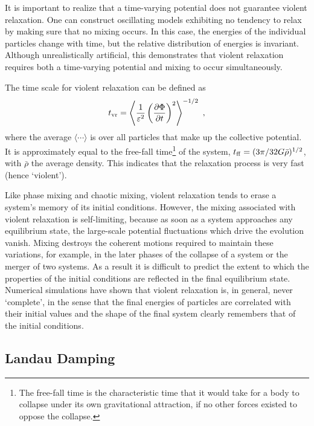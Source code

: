\documentclass[12pt,a4paper]{article}
\begin{document}
It is important to realize that a time-varying potential does not guarantee violent relaxation. One can construct oscillating models exhibiting no tendency to relax by making sure that no mixing occurs. In this case, the energies of the individual particles change with time, but the relative distribution of energies is invariant. Although unrealistically artificial, this demonstrates that violent relaxation requires both a time-varying potential and mixing to occur simultaneously.

The time scale for violent relaxation can be defined as
\begin{equation}
t_{\rm vr} = \left\langle \dfrac{1}{\varepsilon^2} \left( \dfrac{\partial \Phi}{\partial t} \right)^2 \right\rangle^{-1/2} ~,
\end{equation}
where the average $\langle \cdots \rangle$ is over all particles that make up the collective potential. It is approximately equal to the free-fall time\footnote{The free-fall time is the characteristic time that it would take for a body to collapse under its own gravitational attraction, if no other forces existed to oppose the collapse.} of the system, $t_{\rm ff} = (3\pi /32G \bar{\rho})^{1/2}$, with $\bar{\rho}$ the average density. This indicates that the relaxation process is very fast (hence `violent').

Like phase mixing and chaotic mixing, violent relaxation tends to erase a system's memory of its initial conditions. However, the mixing associated with violent relaxation is self-limiting, because as soon as a system approaches any equilibrium state, the large-scale potential fluctuations which drive the evolution vanish. Mixing destroys the coherent motions required to maintain these variations, for example, in the later phases of the collapse of a system or the merger of two systems. As a result it is difficult to predict the extent to which the properties of the initial conditions are reflected in the final equilibrium state. Numerical simulations have shown that violent relaxation is, in general, never `complete', in the sense that the final energies of particles are correlated with their initial values and the shape of the final system clearly remembers that of the initial conditions.


\subsection{Landau Damping}
\cite{2010gfe..book.....M} 
\end{document}
